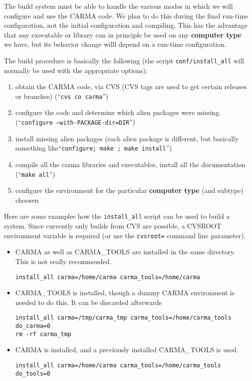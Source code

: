 \documentclass{article}
\begin{document}
The build system must be able to handle the various modes
in which we will configure and use the CARMA code. We plan to do this during the
final run-time configuration, 
not the initial configuration and compiling. This has the advantage that any executable or
library can in principle be used on any {\bf computer type} we have,
but its behavior change willl depend on a run-time configuration.

The build procedure is basically the following (the script \verb+conf/install_all+
will normally be used with the appropriate options):

\begin{enumerate}
\item
obtain the CARMA code, via CVS (CVS tags are used to get certain releases or branches)
(``{\tt cvs co carma}'')
\item
configure the code and determine which alien packages were missing.
\newline
(``{\tt configure --with-PACKAGE-dir=DIR}'')
\item
install missing alien packages (each alien package is different, but
basically something like``{\tt configure; make ; make install}'')
\item
compile all the carma libraries and executables, install all the documentation
(``{\tt make all}'')
\item
configure the environment for the particular {\bf computer type} (and subtype) choosen
\end{enumerate}

Here are some examples how the {\tt install\_all} script can be used to
build a system. Since currently only builds from CVS are possible, a CVSROOT
environment variable is required (or use the {\tt cvsroot=} command line parameter).
\begin{itemize}

\item
CARMA as well as CARMA\_TOOLS are installed in the same directory.
This is not really recommended.

\footnotesize\begin{verbatim}
install_all carma=/home/carma carma_tools=/home/carma
\end{verbatim}\normalsize

\item
CARMA\_TOOLS is installed, though a dummy CARMA environment is needed to do this. It can
be discarded afterwards

\footnotesize\begin{verbatim}
install_all carma=/tmp/carma_tmp carma_tools=/home/carma_tools do_carma=0
rm -rf carma_tmp
\end{verbatim}\normalsize


\item
CARMA is installed, and a previously installed 
CARMA\_TOOLS is used.

\footnotesize\begin{verbatim}
install_all carma=/home/carma carma_tools=/home/carma_tools do_tools=0
\end{verbatim}\normalsize


\end{itemize}
\end{document}
